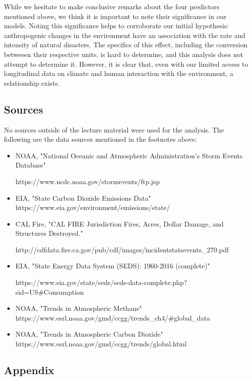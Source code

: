 \documentclass[10pt,]{article}
\begin{document}
While we hesitate to make conclusive remarks about the four predictors
mentioned above, we think it is important to note their significance in
our models. Noting this significance helps to corroborate our initial
hypothesis: anthropogenic changes in the environment have an association
with the rate and intensity of natural disasters. The specifics of this
effect, including the conversion betweeen their respective units, is
hard to determine, and this analysis does not attempt to determine it.
However, it is clear that, even with our limited access to longitudinal
data on climate and human interaction with the environment, a
relationship exists.

\newpage

\subsection{Sources}\label{sources}

No sources outside of the lecture material were used for the analysis.
The following are the data sources mentioned in the footnotes above:

\begin{itemize}
  \item NOAA, "National Oceanic and Atmospheric Administration's Storm Events Database" 
  
  https://www.ncdc.noaa.gov/stormevents/ftp.jsp
  \item EIA, "State Carbon Dioxide Emissions Data" https://www.eia.gov/environment/emissions/state/
  \item CAL Fire, "CAL FIRE Jurisdiction Fires, Acres, Dollar Damage, and Structures Destroyed."
  
  http://cdfdata.fire.ca.gov/pub/cdf/images/incidentstatsevents\_270.pdf
  \item EIA, "State Energy Data System (SEDS): 1960-2016 (complete)"
  
  https://www.eia.gov/state/seds/seds-data-complete.php?sid=US\#Consumption
  \item NOAA, "Trends in Atmospheric Methane" https://www.esrl.noaa.gov/gmd/ccgg/trends\_ch4/\#global\_data
  \item NOAA, "Trends in Atmospheric Carbon Dioxide" https://www.esrl.noaa.gov/gmd/ccgg/trends/global.html
\end{itemize}

\newpage

\subsection{Appendix}\label{appendix}
\end{document}

